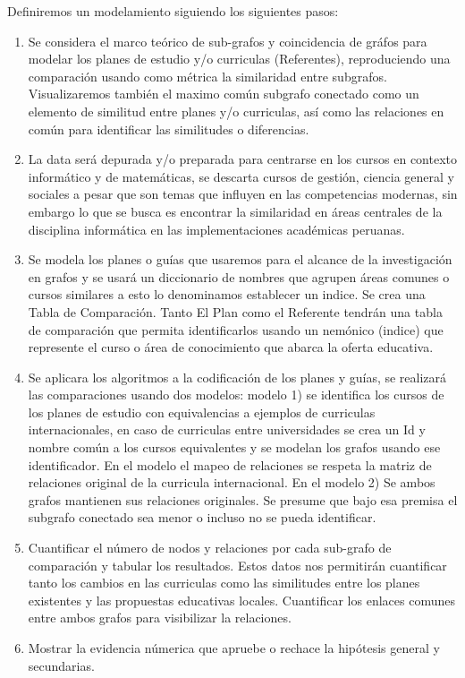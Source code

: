 Definiremos un modelamiento siguiendo los siguientes pasos:

\begin{enumerate}


	\item Se considera el marco teórico de sub-grafos y coincidencia de gráfos para modelar los planes de estudio y/o curriculas (Referentes), reproduciendo una comparación usando como métrica la similaridad entre subgrafos. Visualizaremos también el maximo común subgrafo conectado como un elemento de similitud entre planes y/o curriculas, así como las relaciones en común para identificar las similitudes o diferencias.

	\item La data será depurada y/o preparada para centrarse en los cursos en contexto informático y de matemáticas, se descarta cursos de gestión, ciencia general y sociales a pesar que son temas que influyen en las competencias modernas, sin embargo lo que se busca es encontrar la similaridad en áreas centrales de la disciplina informática en las implementaciones académicas peruanas. 

	\item Se modela los planes o guías que usaremos para el alcance de la investigación en grafos y se usará un diccionario de nombres que agrupen áreas comunes o cursos similares a esto lo denominamos establecer un indice. Se crea una Tabla de Comparación. Tanto El Plan como el Referente tendrán una tabla de comparación que permita identificarlos usando un nemónico (indice) que represente el curso o área de conocimiento que abarca la oferta educativa.

	\item Se aplicara los algoritmos a la codificación de los planes y guías, se realizará las comparaciones usando dos modelos: modelo 1) se identifica los cursos de los planes de estudio con equivalencias a ejemplos de curriculas internacionales, en caso de curriculas entre universidades se crea un Id y nombre común a los cursos equivalentes y se modelan los grafos usando ese identificador. En el modelo el mapeo de relaciones se respeta la matriz de relaciones original de la curricula internacional. En el modelo 2) Se ambos grafos mantienen sus relaciones originales. Se presume que bajo esa premisa el subgrafo conectado sea menor o incluso no se pueda identificar.

	\item Cuantificar el número de nodos y relaciones por cada sub-grafo de comparación y tabular los resultados. Estos datos nos permitirán cuantificar tanto los cambios en las curriculas como las similitudes entre los planes existentes y las propuestas educativas locales. Cuantificar los enlaces comunes entre ambos grafos para visibilizar la relaciones.

	\item Mostrar la evidencia númerica que apruebe o rechace la hipótesis general y secundarias.

\end{enumerate}

